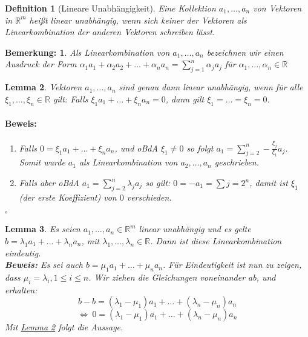 \documentclass{report}
\newcommand{\IN}[1]{\index{#1|BH}}
\newcommand{\lb}{\lambda}
\newcommand{\R}{\mathbb{R}}
\newcommand{\al}{\alpha}
\theoremstyle{customrem}
\newtheorem*{bem}{Bemerkung\textnormal:}
\theoremstyle{customdef}
\newtheorem{definition}{Definition}[chapter]
\newtheorem{lemma}[definition]{Lemma}
\renewenvironment{proof}{\vspace{-.75cm}\paragraph{Beweis: }}{\vspace{-.5cm}\hfill$\square$}
\begin{document}
	\vspace{.2cm}
	\begin{definition}[Lineare Unabhängigkeit]
		\IN{Lineare!Unabhängigkeit}
		\label{deflineareunab}
		Eine Kollektion $a_1, \dots, a_n$ von Vektoren in $\R^m$ heißt linear unabhängig, wenn sich keiner der Vektoren als Linearkombination der anderen Vektoren schreiben lässt.
	\end{definition}
	
	\begin{bem}
		Als Linearkombination von $a_1, \dots, a_n$ bezeichnen  wir einen Ausdruck der Form $\al_1a_1 + \al_2 a_2 + \ldots + \al_n a_n = \sum_{j=1}^n \al_j a_j$ für $\al_1, \dots, \al_n \in \R$
	\end{bem}

	\begin{lemma}
		\label{lem10}
		Vektoren $a_1, \dots, a_n$ sind genau dann linear unabhängig, wenn für alle $\xi_1, \dots, \xi_n \in\R$ gilt: Falls $\xi_1a_1 + \dots + \xi_na_n = 0$, dann gilt $\xi_1 = \dots = \xi_n = 0$.\\
		\begin{proof}
			\begin{enumerate}
				\itemsep-.125cm
				\item Falls $0 = \xi_1 a_1 + \dots + \xi_n a_n$, und oBdA $\xi_1 \neq 0$ so folgt $a_1 = \sum_{j=2}^n -\frac{\xi_j}{\xi_1} a_j$. Somit wurde $a_1$ als Linearkombination von $a_2, \dots, a_n$ geschrieben.
				\item Falls aber oBdA $a_1 = \sum_{j=2}^n \lb_j a_j$ so gilt: $0 = -a_1 = \sum{j=2}^n$, damit ist $\xi_1$ (der erste Koeffizient) von $0$ verschieden.
			\end{enumerate}
		\end{proof}
	\end{lemma}
	
	\begin{lemma}
		\label{lem11}
		Es seien $a_1, \dots, a_n \in \R^m$  linear unabhängig und es gelte $b = \lb_1a_1 + \dots + \lb_n a_n$, mit $\lb_1, \dots, \lb_n \in \R$. Dann ist diese Linearkombination eindeutig.\\
		\textbf{Beweis:} Es sei auch $b = \mu_1 a_1 + \dots + \mu_n a_n$. Für Eindeutigkeit ist nun zu zeigen, dass $\mu_i = \lb_i, 1 \le i \le n$.
		Wir ziehen die Gleichungen voneinander ab, und erhalten:
		$$
		b - b= (\lb_1 - \mu_1) a_1 + \ldots + (\lb_n - \mu_n) a_n$$$$
		\Leftrightarrow \ 0 = (\lb_1 - \mu_1) a_1 + \ldots + (\lb_n - \mu_n) a_n
		$$
		Mit \hyperref[lem10]{Lemma \ref{lem10}} folgt die Aussage.
	\end{lemma}
	
\end{document}
